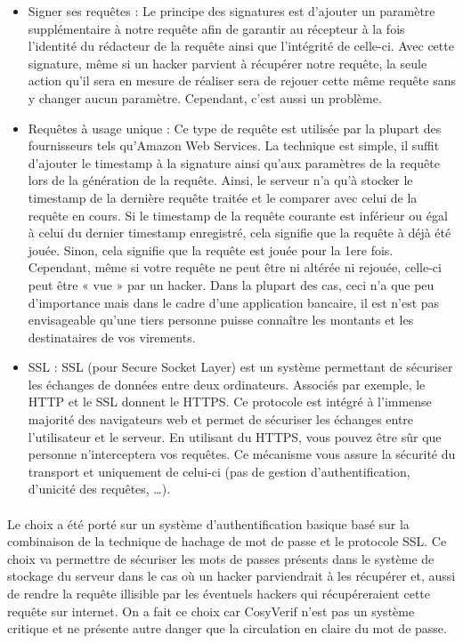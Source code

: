 \documentclass{report}
\begin{document}
\begin{itemize}
\item Signer ses requêtes : Le principe des signatures est d’ajouter un paramètre supplémentaire à notre requête afin de
garantir au récepteur à la fois l’identité du rédacteur de la requête ainsi que l’intégrité de celle-ci. Avec cette signature, 
même si un hacker parvient à récupérer notre requête, la seule action qu’il sera en mesure de réaliser sera de rejouer 
cette même requête sans y changer aucun paramètre. Cependant, c'est aussi un problème.
\item  Requêtes à usage unique : Ce type de requête est utilisée par la plupart des fournisseurs tels qu’Amazon Web 
Services. La technique est simple, il suffit d’ajouter le timestamp à la signature ainsi qu’aux paramètres de la requête lors 
de la génération de la requête. Ainsi, le serveur n’a qu’à stocker le timestamp de la dernière requête traitée et le 
comparer avec celui de la requête en cours. Si le timestamp de la requête courante est inférieur ou égal à celui du dernier 
timestamp enregistré, cela signifie que la requête à déjà été jouée. Sinon, cela signifie que la requête est jouée pour la 
1ere fois. Cependant, même si votre requête ne peut être ni altérée ni rejouée, celle-ci peut être « vue » par un hacker. Dans la plupart des cas, ceci n’a que peu d’importance mais dans le cadre d’une application bancaire, il est n’est pas envisageable qu’une tiers personne puisse connaître les montants et les destinataires de vos virements.
\item  SSL : SSL (pour Secure Socket Layer) est un système permettant de sécuriser les échanges de données entre deux 
ordinateurs. Associés par exemple, le HTTP et le SSL donnent le HTTPS. Ce protocole est intégré à l’immense majorité des 
navigateurs web et permet de sécuriser les échanges entre l’utilisateur et le serveur. En utilisant du HTTPS, vous pouvez 
être sûr que personne n’interceptera vos requêtes. Ce mécanisme vous assure la sécurité du transport et uniquement de 
celui-ci (pas de gestion d’authentification, d’unicité des requêtes, …).
\end{itemize}

\paragraph{}
Le choix a été porté sur un système d'authentification basique basé sur la combinaison de la technique de hachage de 
mot de passe et le protocole SSL. Ce choix va permettre de sécuriser les mots de passes présents dans le système de
stockage du serveur dans le cas où un hacker parviendrait à les récupérer et, aussi de rendre la requête illisible par les 
éventuels hackers qui récupéreraient cette requête sur internet. On a fait ce choix car CosyVerif n'est pas un système
critique et ne présente autre danger que la circulation en claire du mot de passe.
\end{document}
